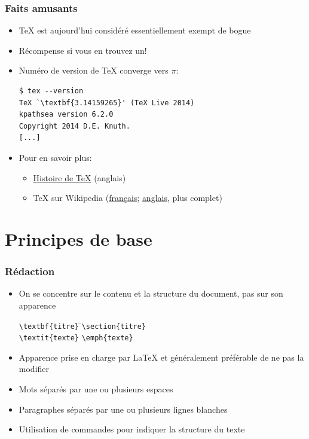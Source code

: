 \documentclass[aspectratio=54,10pt,xcolor=x11names]{beamer}
\theoremstyle{example}
\begin{document}
\begin{frame}[fragile=singleslide]
  \frametitle{Faits amusants}
  \begin{itemize}
  \item {\TeX} est aujourd'hui considéré essentiellement exempt de bogue
  \item Récompense si vous en trouvez un!
  \item Numéro de version de {\TeX} converge vers $\pi$:
\begin{lstlisting}
$ tex --version
TeX `\textbf{3.14159265}' (TeX Live 2014)
kpathsea version 6.2.0
Copyright 2014 D.E. Knuth.
[...]
\end{lstlisting}
  \item Pour en savoir plus:
    \begin{itemize}
    \item \href{http://www.tug.org/whatis.html}{Histoire de \TeX} (anglais)
    \item {\TeX} sur Wikipedia
      (\href{http://fr.wikipedia.org/wiki/TeX}{français};
      \href{http://en.wikipedia.org/wiki/TeX}{anglais}, plus complet)
    \end{itemize}
  \end{itemize}
\end{frame}


\section{Principes de base}

\begin{frame}[fragile=singleslide]
  \frametitle{Rédaction}
  \begin{itemize}
  \item On se concentre sur le contenu et la \alert{structure} du
    document, pas sur son \alert{apparence}
      \bigskip
      \begin{tabbing}
        \verb=\textbf{titre}= \qquad\= \faArrowRight \qquad\= \verb|\section{titre}| \\[6pt]
        \verb|\textit{texte}| \> \faArrowRight \> \verb|\emph{texte}|
      \end{tabbing}
      \bigskip
  \item Apparence prise en charge par {\LaTeX} et généralement préférable de ne
    pas la modifier
  \item Mots séparés par une ou plusieurs \alert{espaces}
  \item Paragraphes séparés par une ou plusieurs \alert{lignes blanches}
  \item Utilisation de \alert{commandes} pour indiquer la structure du texte
  \end{itemize}
\end{frame}
\end{document}
